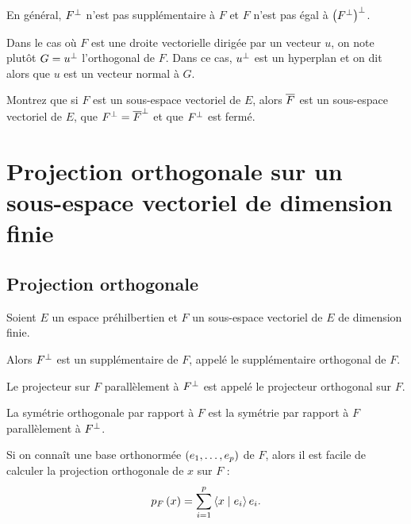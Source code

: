 \begin{rem}
En général, \(F^{\perp}\) n'est pas supplémentaire à \(F\) et \(F\) n'est pas égal à \(\left(F^{\perp}\right)^{\perp}\).
\end{rem}

\begin{rem}
Dans le cas où \(F\) est une droite vectorielle dirigée par un vecteur \(u\), on note plutôt \(G=u^{\perp}\) l'orthogonal de \(F\). Dans ce cas, \(u^{\perp}\) est un hyperplan et on dit alors que \(u\) est un vecteur normal à \(G\).
\end{rem}

\begin{exo}
Montrez que si \(F\) est un sous-espace vectoriel de \(E\), alors \(\overline{F}\) est un sous-espace vectoriel de \(E\), que \(F^{\perp}=\overline{F}^{\perp}\) et que \(F^{\perp}\) est fermé.
\end{exo}

\section{Projection orthogonale sur un sous-espace vectoriel de dimension finie}

\subsection{Projection orthogonale}

\begin{defi}
Soient \(E\) un espace préhilbertien et \(F\) un sous-espace vectoriel de \(E\) de dimension finie.

Alors \(F^{\perp}\) est un supplémentaire de \(F\), appelé le supplémentaire orthogonal de \(F\).

Le projecteur sur \(F\) parallèlement à \(F^{\perp}\) est appelé le projecteur orthogonal sur \(F\).

La symétrie orthogonale par rapport à \(F\) est la symétrie par rapport à \(F\) parallèlement à \(F^{\perp}\).
\end{defi}

Si on connaît une base orthonormée \(\left(e_1,\dots,e_p\right)\) de \(F\), alors il est facile de calculer la projection orthogonale de \(x\) sur \(F\) : \[p_F\paren{x}=\sum_{i=1}^p\ps{x}{e_i}e_i.\]

